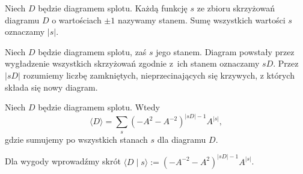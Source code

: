 \begin{definition}[stan]
    Niech $D$ będzie diagramem splotu.
    Każdą funkcję $s$ ze zbioru skrzyżowań diagramu $D$ o wartościach $\pm 1$ nazywamy stanem.
    Sumę wszystkich wartości $s$ oznaczamy $|s|$.
\end{definition}

\begin{definition}
    Niech $D$ będzie diagramem splotu, zaś $s$ jego stanem.
    Diagram powstały przez wygładzenie wszystkich skrzyżowań zgodnie z~ich stanem oznaczamy $sD$.
    Przez $|sD|$ rozumiemy liczbę zamkniętych, nieprzecinających się krzywych, z których składa się nowy diagram.
\end{definition}

\begin{proposition}
    Niech $D$ będzie diagramem splotu.
    Wtedy
    \begin{equation}
        \langle D\rangle = \sum_s (-A^2-A^{-2})^{|sD|-1} A^{|s|},
    \end{equation}
    gdzie sumujemy po wszystkich stanach $s$ dla diagramu $D$.
\end{proposition}

Dla wygody wprowadźmy skrót $\langle D \mid s \rangle := (-A^{-2}-A^2)^{|sD|-1}A^{|s|}$.

